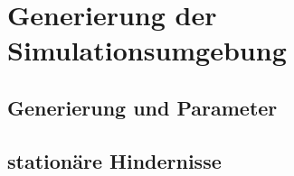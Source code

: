 \newpage
\section{Generierung der Simulationsumgebung}
\subsection{Generierung und Parameter}
\subsection{stationäre Hindernisse}
